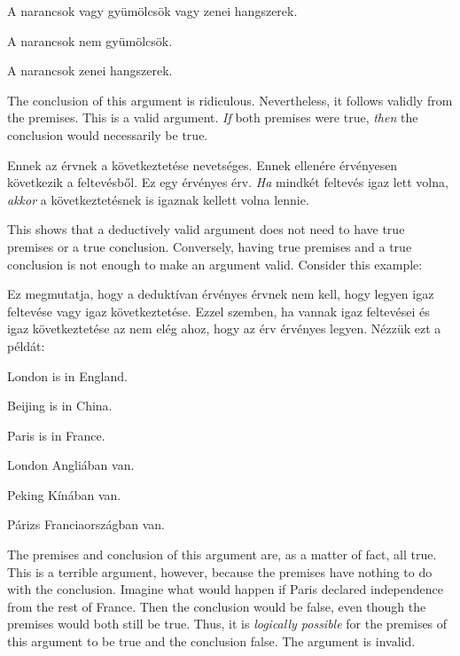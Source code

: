 \begin{earg}
\item[] A narancsok vagy gyümölcsök vagy zenei hangszerek.
\item[] A narancsok nem gyümölcsök.
\item[\therefore] A narancsok zenei hangszerek.
\end{earg}

The conclusion of this argument is ridiculous. Nevertheless, it follows validly from the premises. This is a valid argument. \emph{If} both premises were true, \emph{then} the conclusion would necessarily be true.

Ennek az érvnek a következtetése nevetséges. Ennek ellenére érvényesen következik a feltevésből. Ez egy érvényes érv. \emph{Ha} mindkét feltevés igaz lett volna, \emph{akkor} a következtetésnek is igaznak kellett volna lennie.

This shows that a deductively valid argument does not need to have true premises or a true conclusion. Conversely, having true premises and a true conclusion is not enough to make an argument valid. Consider this example:

Ez megmutatja, hogy a deduktívan érvényes érvnek nem kell, hogy legyen igaz feltevése vagy igaz következtetése. Ezzel szemben, ha vannak igaz feltevései és igaz következtetése az nem elég ahoz, hogy az érv érvényes legyen. Nézzük ezt a példát:

\begin{earg}
\item[] London is in England.
\item[] Beijing is in China.
\item[\therefore] Paris is in France.
\end{earg}

\begin{earg}
\item[] London Angliában van.
\item[] Peking Kínában van.
\item[\therefore] Párizs Franciaországban van.
\end{earg}



The premises and conclusion of this argument are, as a matter of fact, all true. This is a terrible argument, however, because the premises have nothing to do with the conclusion. Imagine what would happen if Paris declared independence from the rest of France. Then the conclusion would be false, even though the premises would both still be true. Thus, it is \emph{logically possible} for the premises of this argument to be true and the conclusion false. The argument is invalid.

